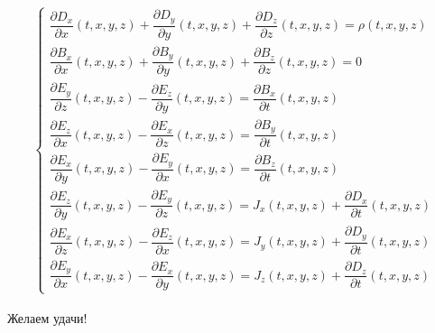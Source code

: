 \documentclass[a4paper]{article}
\begin{document}
	\begin{gather*}
		\begin{cases}
			\dfrac{\partial D_x}{\partial x}(t, x, y, z) + \dfrac{\partial D_y}{\partial y}(t, x, y, z) + \dfrac{\partial D_z}{\partial z}(t, x, y, z) = \rho(t, x, y, z) \\
			\dfrac{\partial B_x}{\partial x}(t, x, y, z) + \dfrac{\partial B_y}{\partial y}(t, x, y, z) + \dfrac{\partial B_z}{\partial z}(t, x, y, z) = 0 \\
			\dfrac{\partial E_y}{\partial z}(t, x, y, z) - \dfrac{\partial E_z}{\partial y}(t, x, y, z) = \dfrac{\partial B_x}{\partial t}(t, x, y, z) \\
			\dfrac{\partial E_z}{\partial x}(t, x, y, z) - \dfrac{\partial E_x}{\partial z}(t, x, y, z) = \dfrac{\partial B_y}{\partial t}(t, x, y, z) \\
			\dfrac{\partial E_x}{\partial y}(t, x, y, z) - \dfrac{\partial E_y}{\partial x}(t, x, y, z) = \dfrac{\partial B_z}{\partial t}(t, x, y, z) \\
			\dfrac{\partial E_z}{\partial y}(t, x, y, z) - \dfrac{\partial E_y}{\partial z}(t, x, y, z) = J_x(t, x, y, z) + \dfrac{\partial D_x}{\partial t}(t, x, y, z) \\
			\dfrac{\partial E_x}{\partial z}(t, x, y, z) - \dfrac{\partial E_z}{\partial x}(t, x, y, z) = J_y(t, x, y, z) + \dfrac{\partial D_y}{\partial t}(t, x, y, z) \\
			\dfrac{\partial E_y}{\partial x}(t, x, y, z) - \dfrac{\partial E_x}{\partial y}(t, x, y, z) = J_z(t, x, y, z) + \dfrac{\partial D_z}{\partial t}(t, x, y, z)
		\end{cases}
	\end{gather*}

	\begin{center}
		Желаем удачи!
	\end{center}
\end{document}
